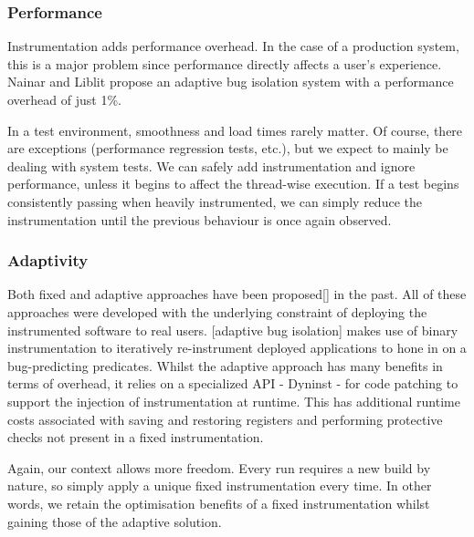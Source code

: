 \subsubsection{Performance}

Instrumentation adds performance overhead. In the case of a production system,
this is a major problem since performance directly affects a user’s experience.
Nainar and Liblit \cite{ArumugaNainar:2010:ABI:1806799.1806839} propose an
adaptive bug isolation system with a performance overhead of just 1\%.

In a test environment, smoothness and load times rarely matter. Of course, there
are exceptions (performance regression tests, etc.), but we expect to mainly be
dealing with system tests. We can safely add instrumentation and ignore
performance, unless it begins to affect the thread-wise execution. If a \flaky
test begins consistently passing when heavily instrumented, we can simply reduce
the instrumentation until the previous \flaky behaviour is once again observed.

\subsubsection{Adaptivity}

Both fixed and adaptive approaches have been proposed[] in the past. All of
these approaches were developed with the underlying constraint of deploying the
instrumented software to real users. [adaptive bug isolation] makes use of
binary instrumentation to iteratively re-instrument deployed applications to
hone in on a bug-predicting predicates. Whilst the adaptive approach has many
benefits in terms of overhead, it relies on a specialized API - Dyninst - for
code patching to support the injection of  instrumentation at runtime. This has
additional runtime costs \cite{DyninstGuide} associated with saving and
restoring registers and performing protective checks not present in a fixed
instrumentation.

Again, our context allows more freedom. Every run requires a new build by
nature, so simply apply a unique fixed instrumentation every time. In other
words, we retain the optimisation benefits of a fixed instrumentation whilst
gaining those of the adaptive solution.
